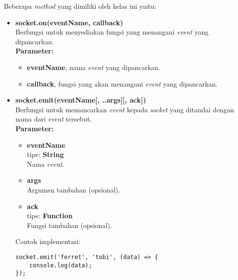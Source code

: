 \begin{enumerate}
	Beberapa \textit{method} yang dimiliki oleh kelas ini yaitu:
	
	\begin{itemize}
		
%	

	\item \textbf{socket.on(eventName, callback)} \\
	Berfungsi untuk menyediakan fungsi yang menangani \textit{event} yang dipancarkan. \\
	\textbf{Parameter:}
	\begin{itemize}
		\item \textbf{eventName}, nama \textit{event} yang dipancarkan.
		\item \textbf{callback}, fungsi yang akan menangani \textit{event} yang dipancarkan.
	\end{itemize}
	
	\item \textbf{socket.emit(eventName[, ..args][, ack])} \\ 
	Berfungsi untuk memancarkan \textit{event} kepada \textit{socket} yang ditandai dengan nama dari \textit{event} tersebut.\\ 
	\textbf{Parameter:}
	\begin{itemize}
		\item \textbf{eventName} \\tipe: \textbf{String} \\ Nama \textit{event}.
		\item \textbf{args} \\ Argumen tambahan (opsional).
		\item \textbf{ack} \\tipe: \textbf{Function} \\ Fungsi tambahan (opsional).
	\end{itemize}
	Contoh implementasi:
\begin{lstlisting}
socket.emit('ferret', 'tobi', (data) => {
	console.log(data);
});
\end{lstlisting}
	
	\end{itemize}


\end{enumerate}
